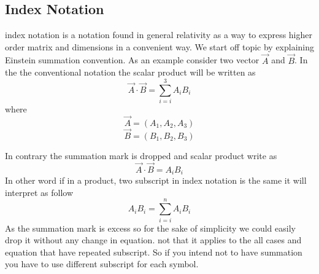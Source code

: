 \subsection{Index Notation}
\begin{minipage}[t]{.49\textwidth}
index notation is a notation found in general relativity as a way to express higher order matrix and dimensions in a convenient way. We start off topic by explaining Einstein summation convention. As an example consider two vector $\vec{A}$ and $\vec{B}$. In the the conventional notation the scalar product will be written as
$$ \vec{A} \cdot \vec{B} = \sum_{i=i}^3 A_i B_i $$
where 
$$ \vec{A} = ( A_1, A_2, A_3 ) $$
$$ \vec{B} = ( B_1, B_2, B_3 ) $$
\end{minipage}%
\hspace{.02\textwidth}
\begin{minipage}[t]{.49\textwidth}
In contrary the summation mark is dropped and scalar product write as
$$ \vec{A} \cdot \vec{B} = A_i B_i $$
In other word if in a product, two subscript in index notation is the same it will interpret as follow
$$ A_i B_i = \sum_{i=i}^n A_i B_i $$
As the summation mark is excess so for the sake of simplicity we could easily drop it without any change in equation. not that it applies to the all cases and equation that have repeated subscript. So if you intend not to have summation you have to use different subscript for each symbol.
\end{minipage}%
\par
\setlength{\parindent}{0.0cm} %
